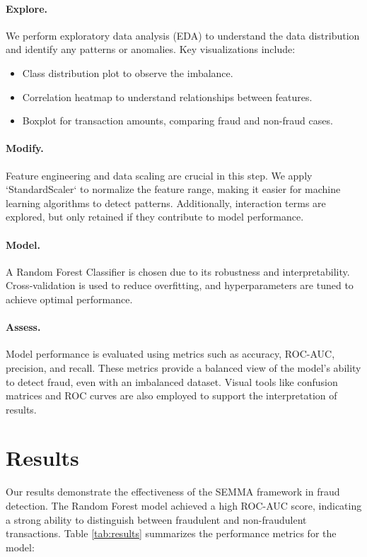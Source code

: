 \documentclass{article} %
\begin{document}
\paragraph{Explore.} We perform exploratory data analysis (EDA) to understand the data distribution and identify any patterns or anomalies. Key visualizations include:
\begin{itemize}
    \item Class distribution plot to observe the imbalance.
    \item Correlation heatmap to understand relationships between features.
    \item Boxplot for transaction amounts, comparing fraud and non-fraud cases.
\end{itemize}

\paragraph{Modify.} Feature engineering and data scaling are crucial in this step. We apply `StandardScaler` to normalize the feature range, making it easier for machine learning algorithms to detect patterns. Additionally, interaction terms are explored, but only retained if they contribute to model performance.

\paragraph{Model.} A Random Forest Classifier is chosen due to its robustness and interpretability. Cross-validation is used to reduce overfitting, and hyperparameters are tuned to achieve optimal performance. 

\paragraph{Assess.} Model performance is evaluated using metrics such as accuracy, ROC-AUC, precision, and recall. These metrics provide a balanced view of the model's ability to detect fraud, even with an imbalanced dataset. Visual tools like confusion matrices and ROC curves are also employed to support the interpretation of results.

\section{Results}
Our results demonstrate the effectiveness of the SEMMA framework in fraud detection. The Random Forest model achieved a high ROC-AUC score, indicating a strong ability to distinguish between fraudulent and non-fraudulent transactions. Table \ref{tab:results} summarizes the performance metrics for the model:
\end{document}
